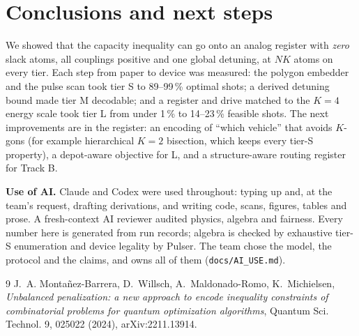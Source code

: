 \documentclass[9pt,twocolumn]{extarticle}
\newcommand{\code}[1]{\texttt{\small #1}}
\begin{document}
\section{Conclusions and next steps}
We showed that the capacity inequality can go onto an analog register with \emph{zero} slack atoms, all couplings positive and one global detuning, at $NK$ atoms on every tier. Each step from paper to device was measured: the polygon embedder and the pulse scan took tier S to 89--99\,\% optimal shots; a derived detuning bound made tier M decodable; and a register and drive matched to the $K=4$ energy scale took tier L from under 1\,\% to 14--23\,\% feasible shots. The next improvements are in the register: an encoding of ``which vehicle'' that avoids $K$-gons (for example hierarchical $K=2$ bisection, which keeps every tier-S property), a depot-aware objective for L, and a structure-aware routing register for Track B.

\noindent\textbf{Use of AI.} Claude and Codex were used throughout: typing up and, at the team's request, drafting derivations, and writing code, scans, figures, tables and prose. A fresh-context AI reviewer audited physics, algebra and fairness. Every number here is generated from run records; algebra is checked by exhaustive tier-S enumeration and device legality by Pulser. The team chose the model, the protocol and the claims, and owns all of them (\code{docs/AI\_USE.md}).

\begin{thebibliography}{9}\small
{} J.~A. Monta\~nez-Barrera, D.~Willsch, A.~Maldonado-Romo, K.~Michielsen, \emph{Unbalanced penalization: a new approach to encode inequality constraints of combinatorial problems for quantum optimization algorithms}, Quantum Sci. Technol. 9, 025022 (2024), arXiv:2211.13914.
\end{thebibliography}
\end{document}
